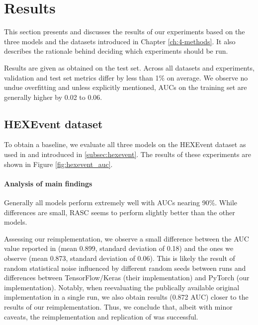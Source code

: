 \chapter{\label{ch:ch5-results}Results}

This section presents and discusses the results of our experiments based on the three models and the datasets introduced in Chapter \ref{ch:4-methods}. It also describes the rationale behind deciding which experiments should be run.

Results are given as obtained on the test set. Across all datasets and experiments, validation and test set metrics differ by less than 1\% on average. We observe no undue overfitting and unless explicitly mentioned, AUCs on the training set are generally higher by 0.02 to 0.06. 
\section{HEXEvent dataset} \label{sec:hexevent_results}
To obtain a baseline, we evaluate all three models on the HEXEvent dataset as used in \cite{dsc} and introduced in \ref{subsec:hexevent}. The results of these experiments are shown in Figure \ref{fig:hexevent_auc}.

\subsubsection{Analysis of main findings}
Generally all models perform extremely well with AUCs nearing 90\%. While differences are small, RASC seems to perform slightly better than the other models.

Assessing our reimplementation, we observe a small difference between the AUC value reported in \cite{dsc} (mean 0.899, standard deviation of 0.18) and the ones we observe (mean 0.873, standard deviation of 0.06). This is likely the result of random statistical noise influenced by different random seeds between runs and differences between TensorFlow/Keras (their implementation) and PyTorch (our implementation). Notably, when reevaluating the publically available original implementation in a single run, we also obtain results (0.872 AUC) closer to the results of our reimplementation. 
Thus, we conclude that, albeit with minor caveats, the reimplementation and replication of \cite{dsc} was successful.

